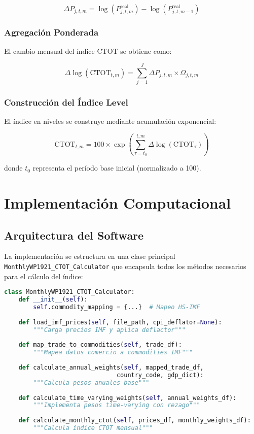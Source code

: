 \documentclass[12pt,a4paper]{article}
\begin{document}
\begin{equation}
\Delta P_{j,t,m} = \log(P^{\text{real}}_{j,t,m}) - \log(P^{\text{real}}_{j,t,m-1})
\label{eq:price_changes}
\end{equation}

\subsubsection{Agregación Ponderada}
El cambio mensual del índice CTOT se obtiene como:

\begin{equation}
\Delta \log(\text{CTOT}_{t,m}) = \sum_{j=1}^{J} \Delta P_{j,t,m} \times \Omega_{j,t,m}
\label{eq:monthly_ctot}
\end{equation}

\subsubsection{Construcción del Índice Level}
El índice en niveles se construye mediante acumulación exponencial:

\begin{equation}
\text{CTOT}_{t,m} = 100 \times \exp\left(\sum_{\tau=t_0}^{t,m} \Delta \log(\text{CTOT}_{\tau})\right)
\label{eq:ctot_level}
\end{equation}

donde $t_0$ representa el período base inicial (normalizado a 100).

\section{Implementación Computacional}

\subsection{Arquitectura del Software}

La implementación se estructura en una clase principal \texttt{MonthlyWP1921\_CTOT\_Calculator} que encapsula todos los métodos necesarios para el cálculo del índice:

\begin{lstlisting}[language=Python, caption=Estructura Principal de la Clase]
class MonthlyWP1921_CTOT_Calculator:
    def __init__(self):
        self.commodity_mapping = {...}  # Mapeo HS-IMF
    
    def load_imf_prices(self, file_path, cpi_deflator=None):
        """Carga precios IMF y aplica deflactor"""
        
    def map_trade_to_commodities(self, trade_df):
        """Mapea datos comercio a commodities IMF"""
        
    def calculate_annual_weights(self, mapped_trade_df, 
                               country_code, gdp_dict):
        """Calcula pesos anuales base"""
        
    def calculate_time_varying_weights(self, annual_weights_df):
        """Implementa pesos time-varying con rezago"""
        
    def calculate_monthly_ctot(self, prices_df, monthly_weights_df):
        """Calcula índice CTOT mensual"""
\end{lstlisting}
\end{document}
